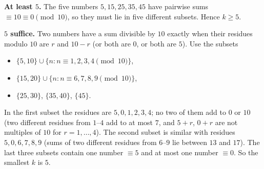 \textbf{At least $5$.} The five numbers $5,15,25,35,45$ have pairwise sums $\equiv10\equiv0\pmod{10}$, so they must lie in five different subsets. Hence $k\ge5$.

\textbf{$5$ suffice.} Two numbers have a sum divisible by $10$ exactly when their residues modulo $10$ are $r$ and $10-r$ (or both are $0$, or both are $5$). Use the subsets
\begin{itemize}
\item $\{5,10\}\cup\{n: n\equiv1,2,3,4\pmod{10}\}$,
\item $\{15,20\}\cup\{n: n\equiv6,7,8,9\pmod{10}\}$,
\item $\{25,30\}$, $\{35,40\}$, $\{45\}$.
\end{itemize}
In the first subset the residues are $5,0,1,2,3,4$; no two of them add to $0$ or $10$ (two different residues from $1$--$4$ add to at most $7$, and $5+r$, $0+r$ are not multiples of $10$ for $r=1,\dots,4$). The second subset is similar with residues $5,0,6,7,8,9$ (sums of two different residues from $6$--$9$ lie between $13$ and $17$). The last three subsets contain one number $\equiv5$ and at most one number $\equiv0$. So the smallest $k$ is $\boxed{5}$.

